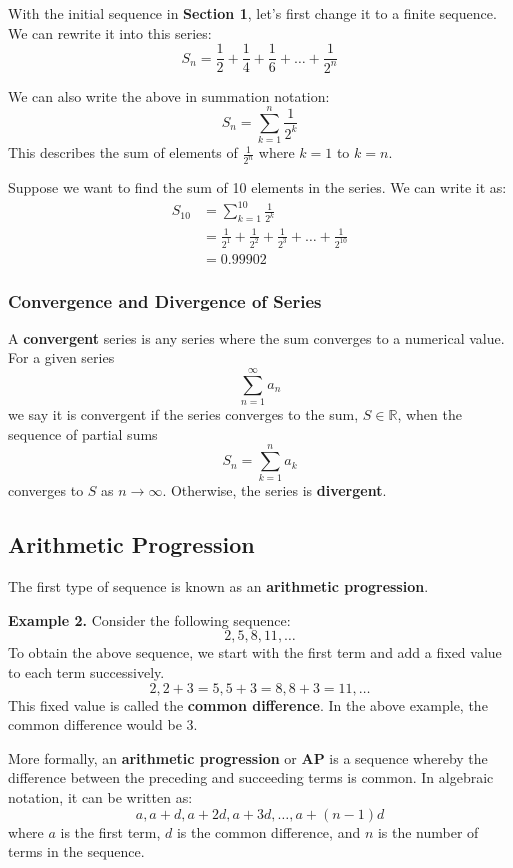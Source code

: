 \documentclass[12pt]{article}
\begin{document}
With the initial sequence in \textbf{Section 1}, let's first change it to a finite sequence. We can rewrite it into this series:
\[
	S_{n} = \frac{1}{2} + \frac{1}{4} + \frac{1}{6} + \dots + \frac{1}{2^{n}}
\]

We can also write the above in summation notation:
\[
	S_{n} = \displaystyle\sum_{k=1}^{n}\frac{1}{2^{k}}
\]
This describes the sum of elements of $\displaystyle\frac{1}{2^{n}}$ where $k=1$ to $k=n$.

Suppose we want to find the sum of 10 elements in the series. We can write it as:
\begin{align*}
	S_{10} & = \displaystyle\sum_{k=1}^{10}\frac{1}{2^{k}}                                    \\
	       & = \frac{1}{2^{1}} + \frac{1}{2^{2}} + \frac{1}{2^{3}} + \dots + \frac{1}{2^{10}} \\
	       & = 0.99902
\end{align*}

\subsubsection{Convergence and Divergence of Series}
A \textbf{convergent} series is any series where the sum converges to a numerical value. For a given series
\[
  \displaystyle\sum_{n=1}^{\infty}a_n
\]
we say it is convergent if the series converges to the sum, $S \in \mathbb{R}$, when the sequence of partial sums
\[
  S_n = \displaystyle\sum_{k=1}^{n}a_k
\]
converges to $S$ as $n \rightarrow \infty$. Otherwise, the series is \textbf{divergent}.

\subsection{Arithmetic Progression}

The first type of sequence is known as an \textbf{arithmetic progression}.

\textbf{Example 2.} Consider the following sequence:
\[
	2, 5, 8, 11, \dots
\]
To obtain the above sequence, we start with the first term and add a fixed value to each term successively.
\[
	2, 2 + 3 = 5, 5 + 3 = 8, 8 + 3 = 11, \dots
\]
This fixed value is called the \textbf{common difference}. In the above example, the common difference would be 3.

More formally, an \textbf{arithmetic progression} or \textbf{AP} is a sequence whereby the difference between the preceding and succeeding terms is common.
In algebraic notation, it can be written as:
\[
	a, a + d, a + 2d, a + 3d, \dots, a + (n-1)d
\]
where $a$ is the first term, $d$ is the common difference, and $n$ is the number of terms in the sequence.
\end{document}
